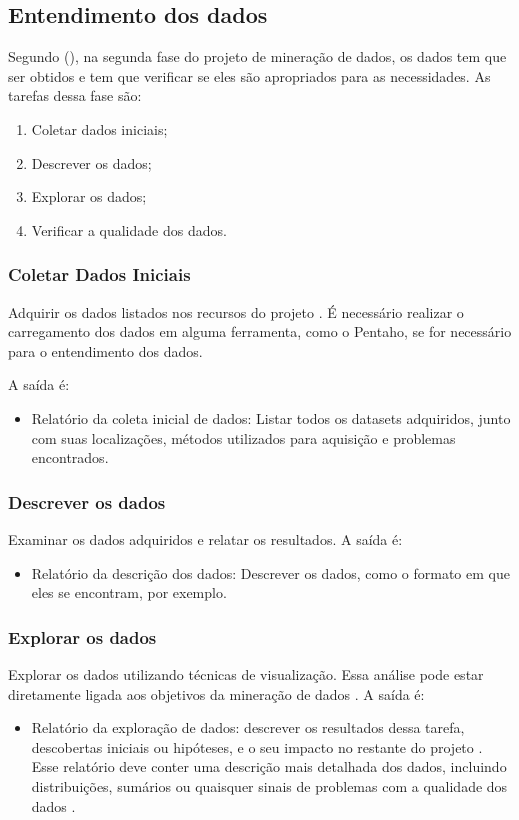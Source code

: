 \subsection{Entendimento dos dados}
Segundo \citeauthor{dmfd} (\citeyear[79]{dmfd}), na segunda fase do projeto de mineração de dados, os dados tem que ser obtidos e tem que verificar se eles são apropriados para as necessidades.
As tarefas dessa fase são:
\begin{enumerate}
    \item Coletar dados iniciais;
    \item Descrever os dados;
    \item Explorar os dados;
    \item Verificar a qualidade dos dados.
\end{enumerate}

\subsubsection{Coletar Dados Iniciais}
Adquirir os dados listados nos recursos do projeto \citep[18]{crispmanual}. É necessário realizar o carregamento dos dados em alguma ferramenta, como o Pentaho, se for necessário para o entendimento dos dados.

A saída é: 
\begin{itemize}
    \item Relatório da coleta inicial de dados: Listar todos os datasets adquiridos, junto com suas localizações, métodos utilizados para aquisição e problemas encontrados. 
\end{itemize}
\subsubsection{Descrever os dados}
Examinar os dados adquiridos e relatar os resultados.
A saída é:
\begin{itemize}
    \item Relatório da descrição dos dados: Descrever os dados, como o formato em que eles se encontram, por exemplo.
\end{itemize}

\subsubsection{Explorar os dados}
Explorar os dados utilizando técnicas de visualização. Essa análise pode estar diretamente ligada aos objetivos da mineração de dados \citep[18]{crispmanual}.
A saída é:
\begin{itemize}
    \item Relatório da exploração de dados: descrever os resultados dessa tarefa, descobertas iniciais ou hipóteses, e o seu impacto no restante do projeto \citep[19]{crispmanual}. Esse relatório deve conter uma descrição mais detalhada dos dados, incluindo distribuições, sumários ou quaisquer sinais de problemas com a qualidade dos dados\citep[81]{dmfd} .
\end{itemize}
